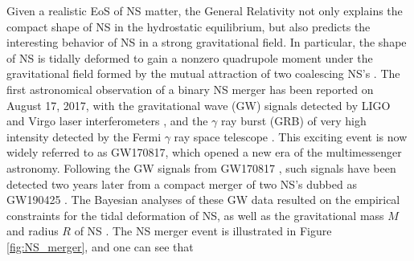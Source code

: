 Given a realistic EoS of NS matter, the General Relativity not only explains 
the compact shape of NS in the hydrostatic equilibrium, but also predicts the interesting 
behavior of NS in a strong gravitational field. In particular, the shape of NS is 
tidally deformed to gain a nonzero quadrupole moment under the gravitational field 
formed by the mutual attraction of two coalescing NS's \cite{?}. 
The first astronomical observation of a binary NS merger has been reported on August 17, 
2017, with the gravitational wave (\gls{GW}) signals detected by LIGO and Virgo laser 
interferometers \cite{?}, and the $\gamma$ ray burst (GRB) of very high intensity 
detected by the Fermi $\gamma$ ray space telescope \cite{?}. This exciting event 
is now widely referred to as GW170817, which opened a new era of the multimessenger 
astronomy. Following the GW signals from GW170817 \citep{abbott2017gw170817}, such signals have been detected two years later from a compact merger of two NS's dubbed as GW190425 
\citep{abbott2020gw190425}. The Bayesian analyses of these GW data resulted on the
empirical constraints for the tidal deformation of NS, as well as the gravitational 
mass $M$ and radius $R$ of NS \citep{abbott2018gw170817}. The \gls{NS} merger event 
is illustrated in Figure \ref{fig:NS_merger}, and one can see that
